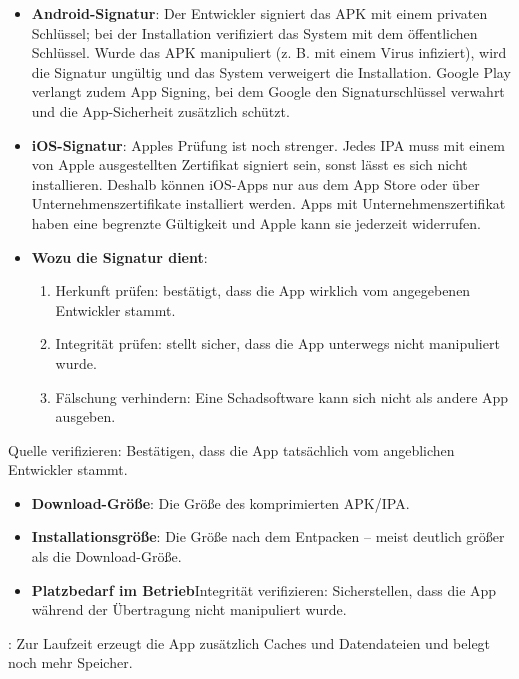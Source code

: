 \begin{itemize}
  \item \textbf{Android-Signatur}: Der Entwickler signiert das APK mit einem privaten Schlüssel; bei der Installation verifiziert das System mit dem öffentlichen Schlüssel. Wurde das APK manipuliert (z. B. mit einem Virus infiziert), wird die Signatur ungültig und das System verweigert die Installation. Google Play verlangt zudem App Signing, bei dem Google den Signaturschlüssel verwahrt und die App-Sicherheit zusätzlich schützt.
  \item \textbf{iOS-Signatur}: Apples Prüfung ist noch strenger. Jedes IPA muss mit einem von Apple ausgestellten Zertifikat signiert sein, sonst lässt es sich nicht installieren. Deshalb können iOS-Apps nur aus dem App Store oder über Unternehmenszertifikate installiert werden. Apps mit Unternehmenszertifikat haben eine begrenzte Gültigkeit und Apple kann sie jederzeit widerrufen.
  \item \textbf{Wozu die Signatur dient}:
  \begin{enumerate}
    \item Herkunft prüfen: bestätigt, dass die App wirklich vom angegebenen Entwickler stammt.
    \item Integrität prüfen: stellt sicher, dass die App unterwegs nicht manipuliert wurde.
    \item Fälschung verhindern: Eine Schadsoftware kann sich nicht als andere App ausgeben.
  \end{enumerate}
\end{itemize}


Quelle verifizieren: Bestätigen, dass die App tatsächlich vom angeblichen Entwickler stammt.

\begin{itemize}
  \item \textbf{Download-Größe}: Die Größe des komprimierten APK/IPA.
  \item \textbf{Installationsgröße}: Die Größe nach dem Entpacken – meist deutlich größer als die Download-Größe.
  \item \textbf{Platzbedarf im Betrieb}Integrität verifizieren: Sicherstellen, dass die App während der Übertragung nicht manipuliert wurde.
\end{itemize}

: Zur Laufzeit erzeugt die App zusätzlich Caches und Datendateien und belegt noch mehr Speicher.

